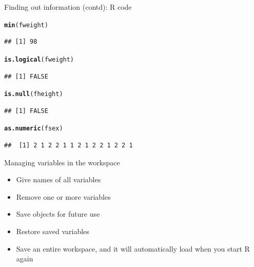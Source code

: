 \documentclass{beamer}\usepackage[]{graphicx}\usepackage[]{color}
\makeatletter
\newcommand{\hlstd}[1]{\textcolor[rgb]{0.345,0.345,0.345}{#1}}%
\newcommand{\hlkwd}[1]{\textcolor[rgb]{0.737,0.353,0.396}{\textbf{#1}}}%
\newenvironment{kframe}{%
 \def\at@end@of@kframe{}%
 \ifinner\ifhmode%
  \def\at@end@of@kframe{\end{minipage}}%
  \begin{minipage}{\columnwidth}%
 \fi\fi%
 \def\FrameCommand##1{\hskip\@totalleftmargin \hskip-\fboxsep
 \colorbox{shadecolor}{##1}\hskip-\fboxsep
     \hskip-\linewidth \hskip-\@totalleftmargin \hskip\columnwidth}%
 \MakeFramed {\advance\hsize-\width
   \@totalleftmargin\z@ \linewidth\hsize
   \@setminipage}}%
 {\par\unskip\endMakeFramed%
 \at@end@of@kframe}
\newenvironment{knitrout}{}{} %
\renewenvironment{knitrout}{\begin{singlespace}}{\end{singlespace}}
\theoremstyle{mystyle}
\makeatother
\begin{document}
\begin{frame}[fragile]{Finding out information (contd): R code}
\begin{knitrout}
\color{fgcolor}\begin{kframe}
\begin{alltt}
\hlkwd{min}\hlstd{(fweight)}
\end{alltt}
\begin{verbatim}
## [1] 98
\end{verbatim}
\begin{alltt}
\hlkwd{is.logical}\hlstd{(fweight)}
\end{alltt}
\begin{verbatim}
## [1] FALSE
\end{verbatim}
\begin{alltt}
\hlkwd{is.null}\hlstd{(fheight)}
\end{alltt}
\begin{verbatim}
## [1] FALSE
\end{verbatim}
\begin{alltt}
\hlkwd{as.numeric}\hlstd{(fsex)}
\end{alltt}
\begin{verbatim}
##  [1] 2 1 2 2 1 1 2 1 2 2 1 2 2 1
\end{verbatim}
\end{kframe}
\end{knitrout}
\end{frame}

\begin{frame}[fragile]{Managing variables in the workspace}
\begin{itemize}
\item Give names of all variables
\item Remove one or more variables
\item Save objects for future use
\item Restore saved variables
\item Save an entire workspace, and it will automatically load when you start R again 
\end{itemize}
\end{frame}
\end{document}

